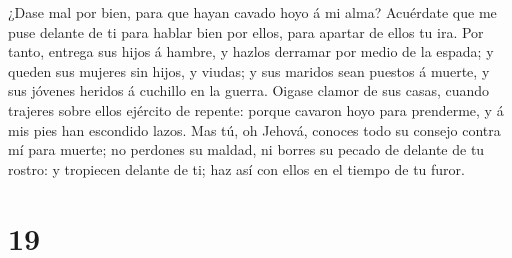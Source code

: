 ¿Dase mal por bien, para que hayan cavado hoyo á mi alma? Acuérdate que
me puse delante de ti para hablar bien por ellos, para apartar de ellos
tu ira.  Por tanto, entrega sus hijos á hambre, y hazlos
derramar por medio de la espada; y queden sus mujeres sin hijos, y
viudas; y sus maridos sean puestos á muerte, y sus jóvenes heridos á
cuchillo en la guerra.  Oigase clamor de sus casas,
cuando trajeres sobre ellos ejército de repente: porque cavaron hoyo
para prenderme, y á mis pies han escondido lazos.  Mas
tú, oh Jehová, conoces todo su consejo contra mí para muerte; no
perdones su maldad, ni borres su pecado de delante de tu rostro: y
tropiecen delante de ti; haz así con ellos en el tiempo de tu furor.

\hypertarget{section-18}{%
\section{19}\label{section-18}}

